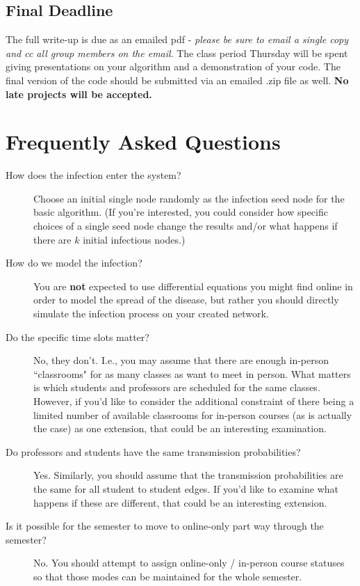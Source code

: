 \documentclass[12pt]{article}
\begin{document}
\subsection{Final Deadline}
The full write-up is due as an emailed pdf - \emph{please be sure to email a single copy and cc all group members on the email}. The class period Thursday will be spent giving presentations on your algorithm and a demonstration of your code. The final version of the code should be submitted via an emailed .zip file as well. \textbf{No late projects will be accepted.}

\section{Frequently Asked Questions}
\begin{description}
\item[How does the infection enter the system?] Choose an initial single node randomly as the infection seed node for the basic algorithm.  (If you're interested, you could consider how specific choices of a single seed node change the results and/or what happens if there are $k$ initial infectious nodes.)
\item[How do we model the infection?] You are \textbf{not} expected to use differential equations you might find online in order to model the spread of the disease, but rather you should directly simulate the infection process on your created network.
\item[Do the specific time slots matter?] No, they don't.  I.e., you may assume that there are enough in-person ``classrooms" for as many classes as want to meet in person.  What matters is which students and professors are scheduled for the same classes.  However, if you'd like to consider the additional constraint of there being a limited number of available classrooms for in-person courses (as is actually the case) as one extension, that could be an interesting examination.
\item[Do professors and students have the same transmission probabilities?] Yes.  Similarly, you should assume that the transmission probabilities are the same for all student to student edges.  If you'd like to examine what happens if these are different, that could be an interesting extension.
\item[Is it possible for the semester to move to online-only part way through the semester?] No.  You should attempt to assign online-only / in-person course statuses so that those modes can be maintained for the whole semester.

\end{description}
\end{document}
